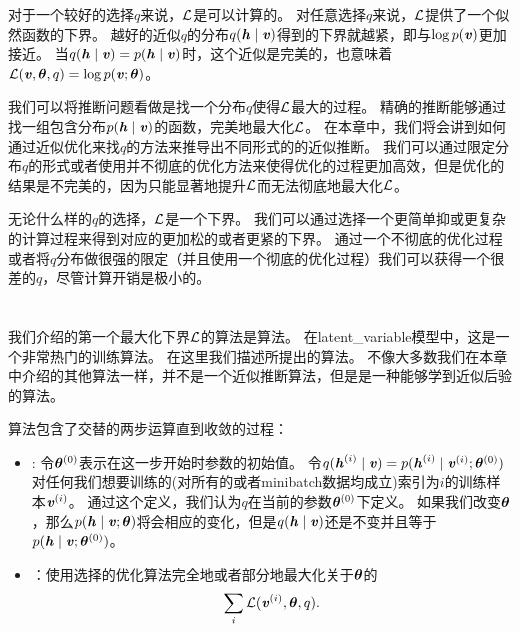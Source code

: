 对于一个较好的选择$q$来说，$\CalL$是可以计算的。
对任意选择$q$来说，$\CalL$提供了一个似然函数的下界。
越好的近似$q$的分布$q(\Vh\mid\Vv)$得到的下界就越紧，即与$\log p(\Vv)$更加接近。
当$q(\Vh\mid\Vv) = p(\Vh\mid\Vv)$时，这个近似是完美的，也意味着$\CalL(\Vv,{\Vtheta},q) = \log {p(\Vv;{\Vtheta})} $。


我们可以将推断问题看做是找一个分布$q$使得$\CalL$最大的过程。
精确的推断能够通过找一组包含分布$p(\Vh\mid\Vv)$的函数，完美地最大化$\CalL$。
在本章中，我们将会讲到如何通过近似优化来找$q$的方法来推导出不同形式的的近似推断。
我们可以通过限定分布$q$的形式或者使用并不彻底的优化方法来使得优化的过程更加高效，但是优化的结果是不完美的，因为只能显著地提升$\CalL$而无法彻底地最大化$\CalL$。


无论什么样的$q$的选择，$\CalL$是一个下界。
我们可以通过选择一个更简单抑或更复杂的计算过程来得到对应的更加松的或者更紧的下界。
通过一个不彻底的优化过程或者将$q$分布做很强的限定（并且使用一个彻底的优化过程）我们可以获得一个很差的$q$，尽管计算开销是极小的。


\section{}
\label{sec:expectation_maximization}

我们介绍的第一个最大化下界$\CalL$的算法是算法。
在\gls{latent_variable}模型中，这是一个非常热门的训练算法。
在这里我们描述\citet{emview}所提出的算法。
不像大多数我们在本章中介绍的其他算法一样，并不是一个近似推断算法，但是是一种能够学到近似后验的算法。


算法包含了交替的两步运算直到收敛的过程：
\begin{itemize}
	\item {}: 令${\Vtheta^{(0)}}$表示在这一步开始时参数的初始值。
	令$q(\Vh^{(i)}\mid \Vv) = p(\Vh^{(i)}\mid\Vv^{(i)};\Vtheta^{(0)})$对任何我们想要训练的(对所有的或者\gls{minibatch}数据均成立)索引为$i$的训练样本$\Vv^{(i)}$。
	通过这个定义，我们认为$q$在当前的参数$\Vtheta^{(0)}$下定义。
	如果我们改变$\Vtheta$，那么$p(\Vh\mid\Vv;\Vtheta)$将会相应的变化，但是$q(\Vh\mid\Vv)$还是不变并且等于$p(\Vh\mid\Vv;\Vtheta^{(0)})$。
	\item {}：使用选择的优化算法完全地或者部分地最大化关于$\Vtheta$的
	\begin{align}
	\sum_i \CalL(\Vv^{(i)},\Vtheta,q).
	\end{align}
\end{itemize}


